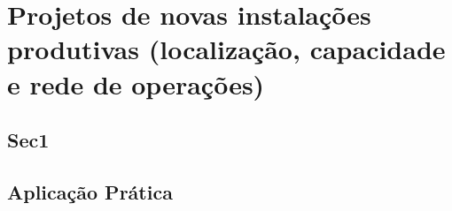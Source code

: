 \chapter{Projetos de novas instalações produtivas (localização, capacidade e rede de operações)} 
\label{chap:projetos_de_novas} 

\section{Sec1} 
\label{sec:projetos_de_novas_sec1} 
 
\section{Aplicação Prática} 
\label{sec:projetos_de_novas_aplicacao}